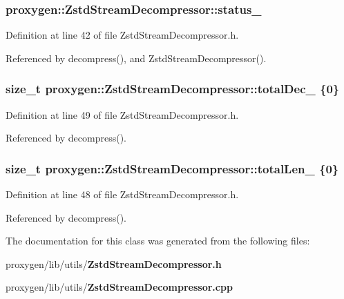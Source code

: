 \subsubsection[{status\+\_\+}]{ proxygen\+::\+Zstd\+Stream\+Decompressor\+::status\+\_\+}\label{classproxygen_1_1ZstdStreamDecompressor_ae79e9f83ea960ab40b9c3fd6e010c4ac}


Definition at line 42 of file Zstd\+Stream\+Decompressor.\+h.



Referenced by decompress(), and Zstd\+Stream\+Decompressor().

\subsubsection[{total\+Dec\+\_\+}]{\setlength{\rightskip}{0pt plus 5cm}size\+\_\+t proxygen\+::\+Zstd\+Stream\+Decompressor\+::total\+Dec\+\_\+ \{0\}\hspace{0.3cm}{\ttfamily [private]}}\label{classproxygen_1_1ZstdStreamDecompressor_a9c627453c1a56fec4572094af9f9fb61}


Definition at line 49 of file Zstd\+Stream\+Decompressor.\+h.



Referenced by decompress().

\subsubsection[{total\+Len\+\_\+}]{\setlength{\rightskip}{0pt plus 5cm}size\+\_\+t proxygen\+::\+Zstd\+Stream\+Decompressor\+::total\+Len\+\_\+ \{0\}\hspace{0.3cm}{\ttfamily [private]}}\label{classproxygen_1_1ZstdStreamDecompressor_a0c4b8e7e8e16e85bc568b0de2fcdfbe8}


Definition at line 48 of file Zstd\+Stream\+Decompressor.\+h.



Referenced by decompress().



The documentation for this class was generated from the following files\+:\begin{DoxyCompactItemize}
\item 
proxygen/lib/utils/{\bf Zstd\+Stream\+Decompressor.\+h}\item 
proxygen/lib/utils/{\bf Zstd\+Stream\+Decompressor.\+cpp}\end{DoxyCompactItemize}
